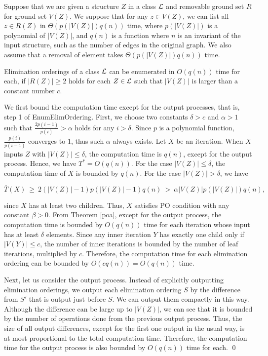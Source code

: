 \documentclass{llncs}
\begin{document}
Suppose that we are given a structure $Z$ in a class $\cal L$ and
 removable ground set $R$ for ground set $V(Z)$.
We suppose that for any $z\in V(Z)$, we can list all $z\in R(Z)$
 in $\Theta(p(|V(Z)|)q(n))$ time, where $p(|V(Z)|)$ is a polynomial
 of $|V(Z)|$, and $q(n)$ is a function where $n$ is an invariant of the
 input structure, such as the number of edges in the original graph.
We also assume that a removal of element takes $\Theta(p(|V(Z)|)q(n))$ time.

\begin{theorem}\label{elim}
Elimination orderings of a class $\cal L$ can be enumerated
 in $O(q(n))$ time for each, if $|R(Z)| \ge 2$ holds for each $Z\in {\cal L}$
 such that $|V(Z)|$ is larger than a constant number $c$.
\end{theorem}

\proof
We first bound the computation time except for the output processes, 
 that is, step 1 of EnumElimOrdering.
First, we choose two constants $\delta>c$ and $\alpha>1$ such that 
 $\frac{2p(i-1)}{p(i)} > \alpha$ holds for any $i > \delta$.
Since $p$ is a polynomial function, $\frac{p(i)}{p(i-1)}$ converges to
 $1$, thus such $\alpha$ always exists.
Let $X$ be an iteration.
When $X$ inputs $Z$ with $|V(Z)| \le \delta$, the computation time 
 is $q(n)$, except for the output process.
Hence, we have $T^* = O(q(n))$.
For the case $|V(Z)| \le \delta$, the computation time of $X$ is bounded
 by $q(n)$.
For the case $|V(Z)| > \delta$, we have 

\vspace{-2mm}
\[ \overline{T}(X) \ \ge \ 2(|V(Z)|-1)p(|V(Z)|-1)q(n)
 \ > \ \alpha |V(Z)|p(|V(Z)|)q(n),\]
\vspace{-3mm}

\noindent
since $X$ has at least two children.
Thus, $X$ satisfies PO condition with any constant $\beta > 0$.
From Theorem \ref{poa}, except for the output process, the computation
 time is bounded by $O(q(n))$ time for each iteration whose input
  has at least $\delta$ elements.
Since any inner iteration $Y$ has exactly one child only if $|V(Y)| \le c$,
 the number of inner iterations is bounded by the number of leaf
 iterations, multiplied by $c$.
Therefore, the computation time for each elimination ordering can be 
 bounded by $O(cq(n)) = O(q(n))$ time.

Next, let us consider the output process.
Instead of explicitly outputting elimination orderings, we output
 each elimination ordering $S$ by the difference from $S'$ that is
  output just before $S$.
We can output them compactly in this way.
Although the difference can be large up to $|V(Z)|$, we can see
 that it is bounded by the number of operations done from the previous 
 output process.
Thus, the size of all output differences, except for the first one output 
 in the usual way, is at most proportional to the total computation time.
Therefore, the computation time for the output process
 is also bounded by $O(q(n))$ time for each.
\qed
\end{document}

